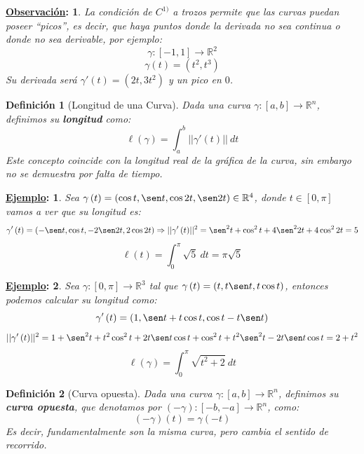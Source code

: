 \documentclass[10pt,a4paper,openright]{book}
\theoremstyle{break}
\newtheorem*{defi}{Definición}
\newtheorem*{obs}{\underline{Observación}:}
\newtheorem*{ej}{\underline{Ejemplo}:}
\newcommand{\dif}[1]{\ d#1}
\begin{document}
\begin{obs}
La condición de $C^{1)}$ a trozos permite que las curvas puedan poseer ``picos'', es decir, que haya puntos donde la derivada no sea continua o donde no sea derivable, por ejemplo: 
$$\gamma: \left[ -1, 1 \right] \rightarrow \mathbb{R}^2$$
$$\gamma \left( t \right) = \left( t^2, t^3 \right) $$
Su derivada será $\gamma'\left( t \right) = \left( 2t, 3t^2 \right)$ y un pico en $0$.
\end{obs}

\begin{defi}[Longitud de una Curva]
Dada una curva $\gamma:[a,b]\rightarrow \mathbb{R}^n$, definimos su \textbf{longitud} como:
$$\ell\left( \gamma \right) = \int_{a}^{b} \lvert \lvert \gamma'\left( t \right) \rvert \rvert \dif{t}$$
Este concepto coincide con la longitud real de la gráfica de la curva, sin embargo no se demuestra por falta de tiempo.
\end{defi}

\begin{ej}
Sea $\gamma\left( t \right) = \left( \cos t, \sen t, \cos 2t, \sen 2t \right) \in \mathbb{R}^4$, donde $t \in \left[ 0, \pi \right]$ vamos a ver que su longitud es:
$$\gamma'\left( t \right) = \left( -\sen t, \cos t, -2\sen 2t, 2\cos 2t\right) \Rightarrow \lvert \lvert \gamma'\left( t \right) \rvert \rvert^2 = \sen^2 t + \cos^2 t + 4\sen^2 2t + 4 \cos^2 2t = 5$$
$$\ell \left( t \right) = \int_{0}^{\pi} \sqrt{5} \dif{t} = \pi\sqrt{5} $$
\end{ej}
\begin{ej}
Sea $\gamma: \left[ 0, \pi \right] \rightarrow \mathbb{R}^3$ tal que $\gamma \left( t \right) = \left( t, t\sen t, t \cos t \right) $, entonces podemos calcular su longitud como:
$$\gamma'\left( t \right) = \left( 1, \sen t + t\cos t, \cos t - t \sen t\right) $$
$$\lvert \lvert \gamma'\left( t \right) \rvert \rvert^2 = 1 + \sen^2 t + t^2 \cos^2 t + 2t \sen t \cos t + \cos^2 t + t^2 \sen^2 t - 2t \sen t \cos t = 2 + t^2$$
$$\ell \left( \gamma \right) = \int_{0}^{\pi} \sqrt{t^2 + 2} \dif{t}$$
\end{ej}

\begin{defi}[Curva opuesta]
Dada una curva $\gamma:[a,b]\rightarrow \mathbb{R}^n$, definimos su \textbf{curva opuesta}, que denotamos por $(-\gamma):[-b,-a]\rightarrow \mathbb{R}^n$, como: 
$$\left( -\gamma \right) \left( t \right) = \gamma \left( -t \right) $$
Es decir, fundamentalmente son la misma curva, pero cambia el sentido de recorrido.
\end{defi}
\end{document}
